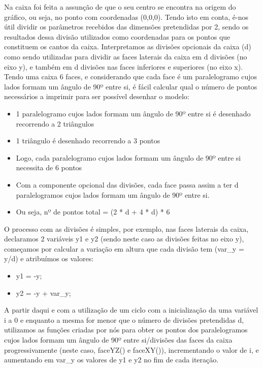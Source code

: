 \documentclass{article}
\begin{document}
Na caixa foi feita a assunção de que o seu centro se encontra na origem do gráfico, ou seja, no ponto com coordenadas (0,0,0).
Tendo isto em conta, é-nos útil dividir os parâmetros recebidos das dimensões pretendidas por 2, sendo os resultados dessa divisão utilizados como coordenadas para os pontos que constituem os cantos da caixa.
Interpretamos as divisões opcionais da caixa (d) como sendo utilizadas para dividir as faces laterais da caixa em d divisões (no eixo y), e também em d divisões nas faces inferiores e superiores (no eixo x).
Tendo uma caixa 6 faces, e considerando que cada face é um paralelogramo cujos lados formam um ângulo de 90º entre si, é fácil calcular qual o número de pontos necessários a imprimir para ser possível desenhar o modelo:
\begin{itemize}
    \item 1 paralelogramo cujos lados formam um ângulo de 90º entre si é desenhado recorrendo a 2 triângulos
    \item 1 triângulo é desenhado recorrendo a 3 pontos
    \item Logo, cada paralelogramo cujos lados formam um ângulo de 90º entre si necessita de 6 pontos
    \item Com a componente opcional das divisões, cada face passa assim a ter d paralelogramos cujos lados formam um ângulo de 90º entre si.
    \item Ou seja, nº de pontos total = (2 * d + 4 * d) * 6
\end{itemize}
O processo com as divisões é simples, por exemplo, nas faces laterais da caixa, declaramos 2 variáveis y1 e y2 (sendo neste caso as divisões feitas no eixo y), começamos por calcular a variação em altura que cada divisão tem (var\_y = y/d) e atribuímos os valores:
\begin{itemize}
    \item y1 = -y;
    \item y2 = -y + var\_y;
\end{itemize}
A partir daqui e com a utilização de um ciclo com a inicialização da uma variável i a 0 e enquanto a mesma for menor que o número de divisões pretendidas d, utilizamos as funções criadas por nós para obter os pontos dos paralelogramos cujos lados formam um ângulo de 90º entre si/divisões das faces da caixa progressivamente (neste caso, faceYZ() e faceXY()), incrementando o valor de i, e aumentando em var\_y os valores de y1 e y2 no fim de cada iteração.
\end{document}
